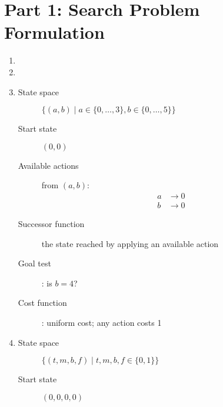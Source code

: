 \documentclass[11pt]{amsart}
\begin{document}
\maketitle

\section*{Part 1: Search Problem Formulation}

\begin{enumerate}

\item

\item

\item

\begin{description}


\item[State space] $\{(a,b) \mid a \in \{0, \dots, 3\}, b \in \{0, \dots, 5\} \}$

\item[Start state] $(0, 0)$

\item[Available actions] from $(a, b)$:
\begin{align*}
	a &\rightarrow 0 \\
	b &\rightarrow 0
\end{align*}

\item[Successor function] the state reached by applying an available action

\item[Goal test]: is $b = 4$?

\item[Cost function]: uniform cost; any action costs 1
\end{description}

\item

\begin{description}


\item[State space] $\{(t, m, b, f) \mid t, m, b, f \in \{0, 1\}\}$

\item[Start state] $(0, 0, 0, 0)$


\end{description}
\end{enumerate}
\end{document}
